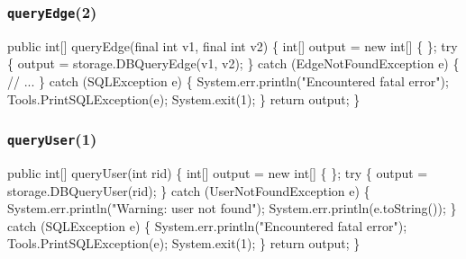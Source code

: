 \documentclass{article}
\def\nwendcode{\endtrivlist \endgroup}      %
\let\nwdocspar=\par
\begin{document}
\subsubsection{{\tt{}queryEdge}(2)}
\nwenddocs{}\endmoddef{}
public int[] queryEdge(final int v1, final int v2) \{
  int[] output = new int[] \{ \};
  try \{
    output = storage.DBQueryEdge(v1, v2);
  \} catch (EdgeNotFoundException e) \{
    // ...
  \} catch (SQLException e) \{
    System.err.println("Encountered fatal error");
    Tools.PrintSQLException(e);
    System.exit(1);
  \}
  return output;
\}
\nwendcode{}\nwdocspar

\subsubsection{{\tt{}\protect{}queryUser}(1)}
\nwenddocs{}\endmoddef{}
public int[] queryUser(int rid) \{
  int[] output = new int[] \{ \};
  try \{
    output = storage.DBQueryUser(rid);
  \} catch (UserNotFoundException e) \{
    System.err.println("Warning: user not found");
    System.err.println(e.toString());
  \} catch (SQLException e) \{
    System.err.println("Encountered fatal error");
    Tools.PrintSQLException(e);
    System.exit(1);
  \}
  return output;
\}
\eatline
{}\nwendcode{}\nwdocspar
\end{document}
